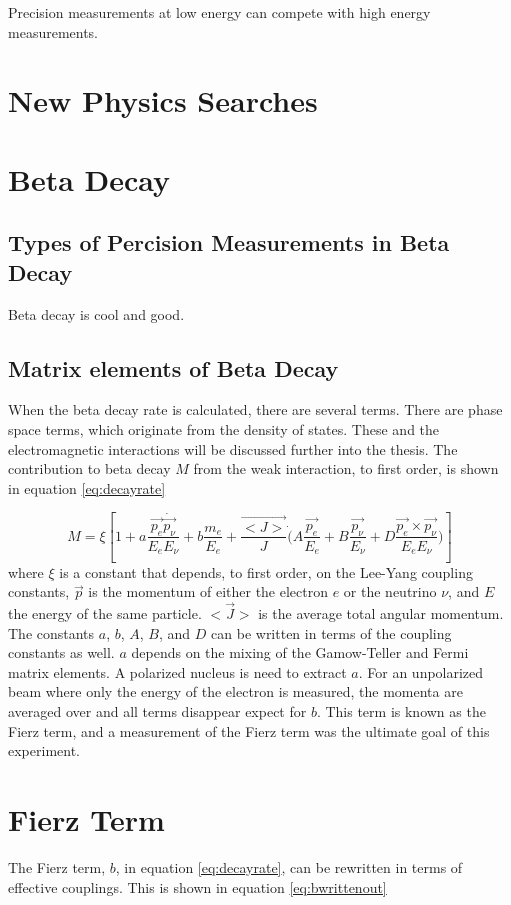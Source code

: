 \documentclass[main.tex]{subfiles}
\begin{document}
Precision measurements at low energy can compete with high energy measurements.

\section{New Physics Searches}
\section{Beta Decay}
\subsection{Types of Percision Measurements in Beta Decay}
Beta decay is cool and good.
\subsection{Matrix elements of Beta Decay}
When the beta decay rate is calculated, there are several terms.
There are phase space terms, which originate from the density of states.
These and the electromagnetic interactions will be discussed further into the thesis. 
The contribution to beta decay $M$ from the weak interaction, to first order, is shown in equation \ref{eq:decayrate} \cite{Gon19}

\begin{equation}
	M = \xi [1 + a \frac{\vec{p_{e}} \dot \vec{p_{\nu}}} {E_{e} E_{\nu}}  +  b \frac{m_{e}}{E_{e}} + \frac{\vec{<J>}}{J} \dot (A \frac{ \vec{p_{e}} }{E_{e}} + B \frac{\vec{p_{\nu}}}{E_{\nu}} + D \frac{\vec{p_{e}} \times \vec{p_{\nu}}}{E_{e} E_{\nu}})]
	\label{eq:decayrate}
\end{equation}
where $\xi$ is a constant that depends, to first order, on the Lee-Yang coupling constants, $\vec{p}$  is the momentum of either the electron $e$ or the neutrino $\nu$, and $E$ the energy of the same particle.
$<\vec{J}>$ is the average total angular momentum. 
The constants $a$, $b$, $A$, $B$, and $D$ can be written in terms of the coupling constants as well.
$a$ depends on the mixing of the Gamow-Teller and Fermi matrix elements.
A polarized nucleus is need to extract $a$. 
For an unpolarized beam where only the energy of the electron is measured, the momenta are averaged over and all terms disappear expect for $b$.
This term is known as the Fierz term, and a measurement of the Fierz term was the ultimate goal of this experiment. 

\section{Fierz Term}
The Fierz term, $b$, in equation \ref{eq:decayrate}, can be rewritten in terms of effective couplings.
This is shown in equation \ref{eq:bwrittenout}
\end{document}
